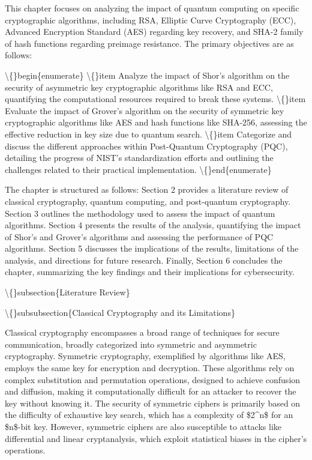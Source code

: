 \documentclass{article}
\begin{document}
This chapter focuses on analyzing the impact of quantum computing on specific cryptographic algorithms, including RSA, Elliptic Curve Cryptography (ECC), Advanced Encryption Standard (AES) regarding key recovery, and SHA-2 family of hash functions regarding preimage resistance. The primary objectives are as follows:

\textbackslash\{\}begin\{enumerate\}
    \textbackslash\{\}item Analyze the impact of Shor's algorithm on the security of asymmetric key cryptographic algorithms like RSA and ECC, quantifying the computational resources required to break these systems.
    \textbackslash\{\}item Evaluate the impact of Grover's algorithm on the security of symmetric key cryptographic algorithms like AES and hash functions like SHA-256, assessing the effective reduction in key size due to quantum search.
    \textbackslash\{\}item Categorize and discuss the different approaches within Post-Quantum Cryptography (PQC), detailing the progress of NIST's standardization efforts and outlining the challenges related to their practical implementation.
\textbackslash\{\}end\{enumerate\}

The chapter is structured as follows: Section 2 provides a literature review of classical cryptography, quantum computing, and post-quantum cryptography. Section 3 outlines the methodology used to assess the impact of quantum algorithms. Section 4 presents the results of the analysis, quantifying the impact of Shor's and Grover's algorithms and assessing the performance of PQC algorithms. Section 5 discusses the implications of the results, limitations of the analysis, and directions for future research. Finally, Section 6 concludes the chapter, summarizing the key findings and their implications for cybersecurity.

\textbackslash\{\}subsection\{Literature Review\}

\textbackslash\{\}subsubsection\{Classical Cryptography and its Limitations\}

Classical cryptography encompasses a broad range of techniques for secure communication, broadly categorized into symmetric and asymmetric cryptography. Symmetric cryptography, exemplified by algorithms like AES, employs the same key for encryption and decryption. These algorithms rely on complex substitution and permutation operations, designed to achieve confusion and diffusion, making it computationally difficult for an attacker to recover the key without knowing it. The security of symmetric ciphers is primarily based on the difficulty of exhaustive key search, which has a complexity of \$2\textasciicircum{}n\$ for an \$n\$-bit key. However, symmetric ciphers are also susceptible to attacks like differential and linear cryptanalysis, which exploit statistical biases in the cipher's operations.
\end{document}
